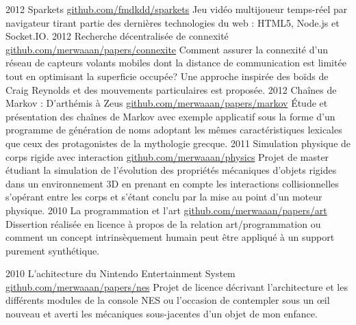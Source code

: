 \documentclass[]{friggeri-cv}
\begin{document}
\begin{entrylist}
  \entry
    {2012}
    {Sparkets}
    {\href{http://github.com/fmdkdd/sparkets}{github.com/fmdkdd/sparkets}}
    {Jeu vidéo multijoueur temps-réel par navigateur tirant partie des
      dernières technologies du web : HTML5, Node.js et Socket.IO.}
  \entry
    {2012}
    {Recherche décentralisée de connexité}
    {\href{https://github.com/merwaaan/papers/blob/master/connexite/rapport.pdf?raw=true}{github.com/merwaaan/papers/connexite}}
    {Comment assurer la connexité d'un réseau de capteurs volants
      mobiles dont la distance de communication est limitée tout en
      optimisant la superficie occupée? Une approche inspirée des
      boïds de Craig Reynolds et des mouvements particulaires est
      proposée.}
  \entry
    {2012}
    {Chaînes de Markov : D'arthémis à Zeus}
    {\href{https://github.com/merwaaan/papers/blob/master/markov/rapport.pdf?raw=true}{github.com/merwaaan/papers/markov}}
    {\'Etude et présentation des chaînes de Markov avec exemple
      applicatif sous la forme d'un programme de génération de noms
      adoptant les mêmes caractéristiques lexicales que ceux des
      protagonistes de la mythologie grecque.}
  \entry
    {2011}
    {Simulation physique de corps rigide avec interaction}
    {\href{http://github.com/merwaaan/physics}{github.com/merwaaan/physics}}
    {Projet de master étudiant la simulation de l'évolution des
      propriétés mécaniques d'objets rigides dans un environnement 3D
      en prenant en compte les interactions collisionnelles s'opérant
      entre les corps et s'étant conclu par la mise au point d'un
      moteur physique.}
  \entry
    {2010}
    {La programmation et l'art}
    {\href{http://github.com/merwaaan/papers/blob/master/art/progart.pdf?raw=true}{github.com/merwaaan/papers/art}}
    {Dissertion réalisée en licence à propos de la relation
      art/programmation ou comment un concept intrinsèquement humain
      peut être appliqué à un support purement synthétique.}

  \entry
    {2010}
    {L'achitecture du Nintendo Entertainment System}
    {\href{https://github.com/merwaaan/papers/blob/master/nes/archines.pdf?raw=true}{github.com/merwaaan/papers/nes}}
    {Projet de licence décrivant l'architecture et les différents
      modules de la console NES ou l'occasion de contempler sous un
      \oe il nouveau et averti les mécaniques sous-jacentes d'un objet
      de mon enfance.}

\end{entrylist}
\end{document}
